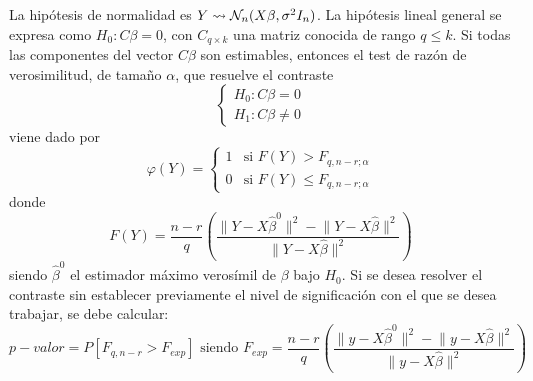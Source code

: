 \documentclass[12pt]{article}
\newcommand{\norma}[1]{\lVert #1 \rVert}
\begin{document}
\begin{ejercicio}[1.25 puntos]
\begin{enumerate}[label=\alph*)]
            La hipótesis de normalidad es $Y \rightsquigarrow \mathcal{N}_n(X \beta, \sigma^2 I_n)$. La hipótesis lineal general
            se expresa como $H_0 : C \beta = 0$, con $C_{q \times k}$ una matriz conocida de rango $q \leq k$. Si todas
            las componentes del vector $C \beta$ son estimables, entonces el test de razón de verosimilitud, de tamaño $\alpha$, que
            resuelve el contraste $$\begin{cases}
                H_0 : C \beta = 0 \\
                H_1 : C \beta \neq 0
            \end{cases}$$
            viene dado por 
            $$\varphi(Y) = \begin{cases}
                1 &\text{si } F(Y) > F_{q, n-r; \alpha} \\
                0 &\text{si } F(Y) \leq F_{q, n-r; \alpha}
            \end{cases}$$
            donde 
            $$F(Y) = \dfrac{n-r}{q} \left( \dfrac{\norma{Y - X \hat{\beta}^0}^2 - \norma{Y - X \hat{\beta}}^2}{\norma{Y - X \hat{\beta}}^2} \right)$$
            siendo $\hat{\beta}^0$ el estimador máximo verosímil de $\beta$ bajo $H_0$.
            Si se desea resolver el contraste sin establecer previamente el nivel de significación con el que se desea
            trabajar, se debe calcular:
            $$p-valor = P[F_{q,n-r} > F_{exp}] \text{ siendo } F_{exp} = \dfrac{n-r}{q} \left( \dfrac{\norma{y - X \hat{\beta}^0}^2 - \norma{y - X \hat{\beta}}^2}{\norma{y - X \hat{\beta}}^2} \right)$$ 
        \end{enumerate}
    \end{ejercicio}

    \newpage
\end{document}
